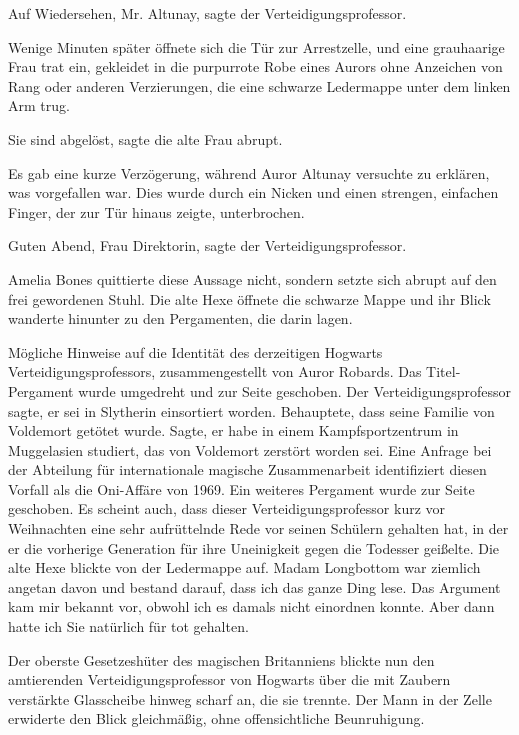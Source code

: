 \glqq Auf Wiedersehen, Mr. Altunay\grqq{}, sagte der Verteidigungsprofessor.

Wenige Minuten später öffnete sich die Tür zur Arrestzelle, und eine grauhaarige
Frau trat ein, gekleidet in die purpurrote Robe eines Aurors ohne Anzeichen von
Rang oder anderen Verzierungen, die eine schwarze Ledermappe unter dem linken
Arm trug.

\glqq Sie sind abgelöst\grqq{}, sagte die alte Frau abrupt.

Es gab eine kurze Verzögerung, während Auror Altunay versuchte zu erklären, was
vorgefallen war. Dies wurde durch ein Nicken und einen strengen, einfachen
Finger, der zur Tür hinaus zeigte, unterbrochen.

\glqq Guten Abend, Frau Direktorin\grqq{}, sagte der Verteidigungsprofessor.

Amelia Bones quittierte diese Aussage nicht, sondern setzte sich abrupt auf den
frei gewordenen Stuhl. Die alte Hexe öffnete die schwarze Mappe und ihr Blick
wanderte hinunter zu den Pergamenten, die darin lagen.

\glqq Mögliche Hinweise auf die Identität des derzeitigen Hogwarts
Verteidigungsprofessors, zusammengestellt von Auror Robards.\grqq{} Das
Titel-Pergament wurde umgedreht und zur Seite geschoben. \glqq Der
Verteidigungsprofessor sagte, er sei in Slytherin einsortiert worden.
Behauptete, dass seine Familie von Voldemort getötet wurde. Sagte, er habe in
einem Kampfsportzentrum in Muggelasien studiert, das von Voldemort zerstört
worden sei. Eine Anfrage bei der Abteilung für internationale magische
Zusammenarbeit identifiziert diesen Vorfall als die Oni-Affäre von 1969.\grqq{}
Ein weiteres Pergament wurde zur Seite geschoben. \glqq Es scheint auch, dass
dieser Verteidigungsprofessor kurz vor Weihnachten eine sehr aufrüttelnde Rede
vor seinen Schülern gehalten hat, in der er die vorherige Generation für ihre
Uneinigkeit gegen die Todesser geißelte.\grqq{} Die alte Hexe blickte von der
Ledermappe auf. \glqq Madam Longbottom war ziemlich angetan davon und bestand
darauf, dass ich das ganze Ding lese. Das Argument kam mir bekannt vor, obwohl
ich es damals nicht einordnen konnte. Aber dann hatte ich Sie natürlich für tot
gehalten.\grqq{}

Der oberste Gesetzeshüter des magischen Britanniens blickte nun den amtierenden
Verteidigungsprofessor von Hogwarts über die mit Zaubern verstärkte Glasscheibe
hinweg scharf an, die sie trennte. Der Mann in der Zelle erwiderte den Blick
gleichmäßig, ohne offensichtliche Beunruhigung.

